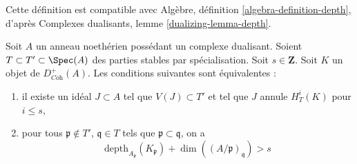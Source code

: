 \noindent
Cette définition est compatible avec Algèbre, définition \ref{algebra-definition-depth}, d'après Complexes dualisants, lemme \ref{dualizing-lemma-depth}.

\begin{proposition}
\label{proposition-annihilator-complex}
Soit $A$ un anneau noethérien possédant un complexe dualisant. Soient $T \subset T' \subset \Spec(A)$ des parties stables par spécialisation. Soit $s \in \mathbf{Z}$. Soit $K$ un objet de $D_{\textit{Coh}}^+(A)$. Les conditions suivantes sont équivalentes :
\begin{enumerate}
\item il existe un idéal $J \subset A$ tel que $V(J) \subset T'$ et tel que $J$ annule $H^i_T(K)$ pour $i \leq s$,
\item pour tous $\mathfrak p \not \in T'$, $\mathfrak q \in T$ tels que $\mathfrak p \subset \mathfrak q$, on a
$$
\text{depth}_{A_\mathfrak p}(K_\mathfrak p) +
\dim((A/\mathfrak p)_\mathfrak q) > s
$$
\end{enumerate}
\end{proposition}

